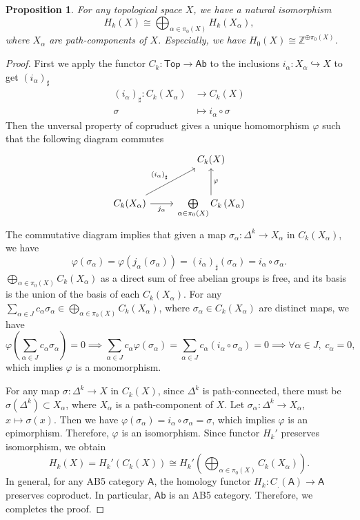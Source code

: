 \documentclass{report}
\newtheorem{proposition}{Proposition}[section]
\theoremstyle{nonumberplain}
\newtheorem{proof}{Proof.}
\begin{document}
\begin{proposition}
For any topological space $X$, we have a natural isomorphism 
$$
H_k(X)\cong\bigoplus_{\alpha\in \pi_0(X)} H_k\left(X_\alpha\right),
$$ 
where $X_\alpha$ are path-components of $X$. Especially, we have $H_0(X)\cong \mathbb{Z}^{\oplus \pi_0(X)}$. 
\end{proposition}
\begin{proof}
	First we apply the functor $C_k:\mathsf{Top}\to\mathsf{Ab}$ to the inclusions $i_\alpha:X_\alpha \hookrightarrow X$ to get $\left(i_\alpha\right)_\sharp$
	\begin{align*}
		\left(i_\alpha\right)_\sharp: C_k(X_\alpha)&\longrightarrow C_k(X)\\
                   \sigma &\longmapsto i_\alpha\circ \sigma
	\end{align*}
	Then the unversal property of copruduct gives a unique homomorphism $\varphi$ such that the following diagram commutes
	\begin{equation*}
		\begin{tikzcd}		
			& C_{k}(X) \\ [10pt]
			C_{k}(X_\alpha) \arrow[ru, "\left(i_\alpha \right)_{\sharp}"] \arrow[r, "j_\alpha"']
			& \bigoplus\limits_{\alpha\in \pi_0(X)} C_k\left(X_\alpha\right) \arrow[u, "\varphi"'] 
		\end{tikzcd}			
	\end{equation*}
	The commutative diagram implies that given a map $\sigma_\alpha:\Delta^k\to X_\alpha$ in $C_k(X_\alpha)$, we have
	\[
		\varphi(\sigma_\alpha)=\varphi(j_\alpha(\sigma_\alpha))=\left(i_\alpha\right)_\sharp(\sigma_\alpha)=i_\alpha\circ\sigma_\alpha.
	\]
	$\bigoplus\limits_{\alpha\in \pi_0(X)} C_k\left(X_\alpha\right)$ as a direct sum of free abelian groups is free, and its basis is the union of the basis of each $C_k\left(X_\alpha\right)$. 
	For any $\sum\limits_{\alpha\in J}c_\alpha\sigma_\alpha\in \bigoplus\limits_{\alpha\in \pi_0(X)} C_k\left(X_\alpha\right)$, where $\sigma_\alpha\in C_k\left(X_\alpha\right)$ are distinct maps, we have
	\[
		\varphi\left(\sum\limits_{\alpha\in J}c_\alpha\sigma_\alpha\right)=0\implies \sum_{\alpha\in J}c_\alpha\varphi\left(\sigma_\alpha\right)=\sum_{\alpha\in J} c_\alpha \left(i_\alpha\circ\sigma_\alpha\right)=0\implies \forall \alpha\in J,\;c_\alpha=0,
	\]
	which implies $\varphi$ is a monomorphism. 

	For any map $\sigma:\Delta^k\to X$ in $C_k(X)$, since $\Delta^k$ is path-connected, there must be $\sigma(\Delta^k)\subset X_\alpha$, where $X_\alpha$ is a path-component of $X$. Let $\sigma_\alpha:\Delta^k\to X_\alpha$, $x\mapsto\sigma(x)$. Then we have $\varphi(\sigma_\alpha)=i_\alpha\circ\sigma_\alpha=\sigma$, which implies $\varphi$ is an epimorphism. Therefore, $\varphi$ is an isomorphism. Since functor $H_k'$ preserves isomorphism, we obtain
	$$
	H_k(X)=H_k'(C_k(X))\cong H_k'\left(\bigoplus_{\alpha\in \pi_0(X)} C_k\left(X_\alpha\right)\right).
	$$ 
	In general, for any AB5 category $\mathsf{A}$, the homology functor $H_k:C_.(\mathsf{A})\to \mathsf{A}$ preserves coproduct. In particular, $\mathsf{Ab}$ is an AB5 category. Therefore, we completes the proof.
\end{proof}
\end{document}
